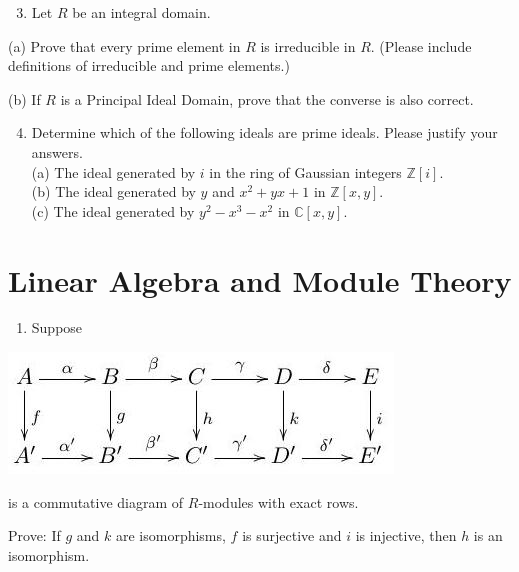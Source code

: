 \documentclass[10pt]{article}
\begin{document}
\begin{enumerate}
  \setcounter{enumi}{2}
  \item Let $R$ be an integral domain.
\end{enumerate}
(a) Prove that every prime element in $R$ is irreducible in $R$. (Please include definitions of irreducible and prime elements.)

(b) If $R$ is a Principal Ideal Domain, prove that the converse is also correct.

\begin{enumerate}
  \setcounter{enumi}{3}
  \item Determine which of the following ideals are prime ideals. Please justify your answers.\\
(a) The ideal generated by $i$ in the ring of Gaussian integers $\mathbb{Z}[i]$.\\
(b) The ideal generated by $y$ and $x^{2}+y x+1$ in $\mathbb{Z}[x, y]$.\\
(c) The ideal generated by $y^{2}-x^{3}-x^{2}$ in $\mathbb{C}[x, y]$.
\end{enumerate}
\section{Linear Algebra and Module Theory}
\begin{enumerate}
  \item Suppose
\end{enumerate}
\includegraphics[max width=\textwidth]{2022_05_24_f62df93b9d660067b55fg-10}

is a commutative diagram of $R$-modules with exact rows.

Prove: If $g$ and $k$ are isomorphisms, $f$ is surjective and $i$ is injective, then $h$ is an isomorphism.
\end{document}
